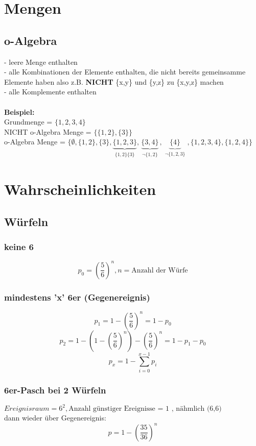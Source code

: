 \documentclass{article}
\begin{document}
\section{Mengen}
\subsection{o-Algebra}
- leere Menge enthalten\\
- alle Kombinationen der Elemente enthalten, die nicht bereits gemeinsamme Elemente haben also z.B. \textbf{NICHT} \{x,y\} und \{y,z\} zu \{x,y,z\} machen\\
- alle Komplemente enthalten\\ \\
\textbf{Beispiel:}\\
Grundmenge = $\{1,2,3,4\}$\\
NICHT o-Algebra Menge = $\{\{1,2\},\{3\}\}$\\
o-Algebra Menge = $\{\emptyset ,\{1,2\},\{3\},
	\underbrace{\{1,2,3\}}_{\substack{\{1,2\}\{3\}}},
	\underbrace{\{3,4\}}_{\substack{\neg \{1,2\}}},
	\underbrace{\{4\}}_{\substack{\neg \{1,2,3\}}},
\{1,2,3,4\},\{1,2,4\}\}$

\section{Wahrscheinlichkeiten}
\subsection{W\"urfeln}
\subsubsection{keine 6}
\[
	p_0 = \left( \frac{5}{6} \right)^n , n = \text{Anzahl der W\"urfe}
\]
\subsubsection{mindestens 'x' 6er (Gegenereignis)}
\[	
	p_1 = 1 - \left( \frac{5}{6} \right)^n = 1 - p_0
\]	
\[		
	p_2 = 1-\left(1 - \left( \frac{5}{6} \right)^n\right)-\left( \frac{5}{6} \right)^n = 1-p_1 -p_0
\]
\[
	p_x = 1 - \sum_{i=0}^{x-1} p_i
\]
\subsubsection{6er-Pasch bei 2 W\"urfeln}
$Ereignisraum = 6^2 , \text{Anzahl g\"unstiger Ereignisse = 1 , n\"ahmlich (6,6)}$\\
dann wieder \"uber Gegenereignis: \\
\[ p=1-\left(\frac{35}{36}\right)^n \]
\end{document}
